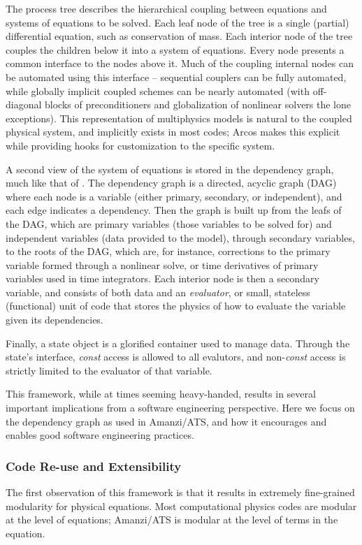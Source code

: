 The process tree describes the hierarchical coupling between equations and systems of equations to be solved.
Each leaf node of the tree is a single (partial) differential equation, such as conservation of mass.
Each interior node of the tree couples the children below it into a system of equations.
Every node presents a common interface to the nodes above it.
Much of the coupling internal nodes can be automated using this interface -- sequential couplers can be fully automated, while globally implicit coupled schemes can be nearly automated (with off-diagonal blocks of preconditioners and globalization of nonlinear solvers the lone exceptions).
This representation of multiphysics models is natural to the coupled physical system, and implicitly exists in most codes; Arcos makes this explicit while providing hooks for customization to the specific system.

A second view of the system of equations is stored in the dependency graph, much like that of \cite{Notz2012}.
The dependency graph is a directed, acyclic graph (DAG) where each node is a variable (either primary, secondary, or independent), and each edge indicates a dependency.
Then the graph is built up from the leafs of the DAG, which are primary variables (those variables to be solved for) and independent variables (data provided to the model), through secondary variables, to the roots of the DAG, which are, for instance, corrections to the primary variable formed through a nonlinear solve, or time derivatives of primary variables used in time integrators.
Each interior node is then a secondary variable, and consists of both data and an \emph{evaluator}, or small, stateless (functional) unit of code that stores the physics of how to evaluate the variable given its dependencies.

Finally, a state object is a glorified container used to manage data.
Through the state's interface, \emph{const} access is allowed to all evalutors, and non-\emph{const} access is strictly limited to the evaluator of that variable.

This framework, while at times seeming heavy-handed, results in several important implications from a software engineering perspective.
Here we focus on the dependency graph as used in Amanzi/ATS, and how it encourages and enables good software engineering practices.

\subsubsection{Code Re-use and Extensibility}
\label{sec:amanzi:modularity}
%
The first observation of this framework is that it results in extremely fine-grained modularity for physical equations.
Most computational physics codes are modular at the level of equations; Amanzi/ATS is modular at the level of terms in the equation.

